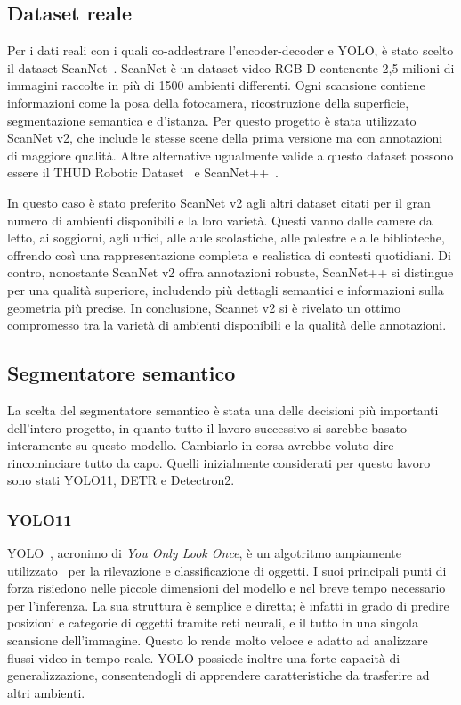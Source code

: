 \documentclass[12pt]{report}
\begin{document}
\subsection{Dataset reale}
\label{sec:dataset_reale}

Per i dati reali con i quali co-addestrare l'encoder-decoder e YOLO, è stato scelto il dataset ScanNet~\cite{dai2017scannet}. ScanNet è un dataset video RGB-D contenente 2,5 milioni di immagini raccolte in più di 1500 ambienti differenti. Ogni scansione contiene informazioni come la posa della fotocamera, ricostruzione della superficie, segmentazione semantica e d'istanza. Per questo progetto è stata utilizzato ScanNet v2, che include le stesse scene della prima versione ma con annotazioni di maggiore qualità. Altre alternative ugualmente valide a questo dataset possono essere il THUD Robotic Dataset~\cite{10611489} e ScanNet++~\cite{yeshwanth2023scannethighfidelitydataset3d}.

In questo caso è stato preferito ScanNet v2 agli altri dataset citati per il gran numero di ambienti disponibili e la loro varietà. Questi vanno dalle camere da letto, ai soggiorni, agli uffici, alle aule scolastiche, alle palestre e alle biblioteche, offrendo così una rappresentazione completa e realistica di contesti quotidiani. Di contro, nonostante ScanNet v2 offra annotazioni robuste, ScanNet++ si distingue per una qualità superiore, includendo più dettagli semantici e informazioni sulla geometria più precise. In conclusione, Scannet v2 si è rivelato un ottimo compromesso tra la varietà di ambienti disponibili e la qualità delle annotazioni.

\subsection{Segmentatore semantico}
\label{sec:segmentatore_semantico}

La scelta del segmentatore semantico è stata una delle decisioni più importanti dell'intero progetto, in quanto tutto il lavoro successivo si sarebbe basato interamente su questo modello. Cambiarlo in corsa avrebbe voluto dire rincominciare tutto da capo. Quelli inizialmente considerati per questo lavoro sono stati YOLO11, DETR e Detectron2.

\subsubsection{YOLO11}
\label{sec:yolo11}

YOLO~\cite{JIANG20221066}, acronimo di \textit{You Only Look Once}, è un algotritmo ampiamente utilizzato~\cite{sultana2020review} per la rilevazione e classificazione di oggetti. I suoi principali punti di forza risiedono nelle piccole dimensioni del modello e nel breve tempo necessario per l'inferenza. La sua struttura è semplice e diretta; è infatti in grado di predire posizioni e categorie di oggetti tramite reti neurali, e il tutto in una singola scansione dell'immagine. Questo lo rende molto veloce e adatto ad analizzare flussi video in tempo reale. YOLO possiede inoltre una forte capacità di generalizzazione, consentendogli di apprendere caratteristiche da trasferire ad altri ambienti.
\end{document}

